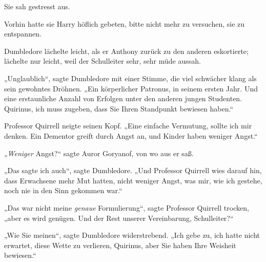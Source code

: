 Sie sah gestresst aus.

Vorhin hatte sie Harry höflich gebeten, bitte nicht mehr zu versuchen, sie zu entspannen.

Dumbledore lächelte leicht, als er Anthony zurück zu den anderen eskortierte; lächelte nur leicht, weil der Schulleiter sehr, sehr müde aussah.

„Unglaublich“, sagte Dumbledore mit einer Stimme, die viel schwächer klang als sein gewohntes Dröhnen. „Ein körperlicher Patronus, in seinem ersten Jahr. Und eine erstaunliche Anzahl von Erfolgen unter den anderen jungen Studenten. Quirinus, ich muss zugeben, dass Sie Ihren Standpunkt bewiesen haben.“

Professor Quirrell neigte seinen Kopf. „Eine einfache Vermutung, sollte ich mir denken. Ein Dementor greift durch Angst an, und Kinder haben weniger Angst.“

„\emph{Weniger} Angst?“ sagte Auror Goryanof, von wo aus er saß.

„Das sagte ich auch“, sagte Dumbledore. „Und Professor Quirrell wies darauf hin, dass Erwachsene mehr Mut hatten, nicht weniger Angst, was mir, wie ich gestehe, noch nie in den Sinn gekommen war.“

„Das war nicht meine \emph{genaue} Formulierung“, sagte Professor Quirrell trocken, „aber es wird genügen. Und der Rest unserer Vereinbarung, Schulleiter?“

„Wie Sie meinen“, sagte Dumbledore widerstrebend. „Ich gebe zu, ich hatte nicht erwartet, diese Wette zu verlieren, Quirinus, aber Sie haben Ihre Weisheit bewiesen.“

